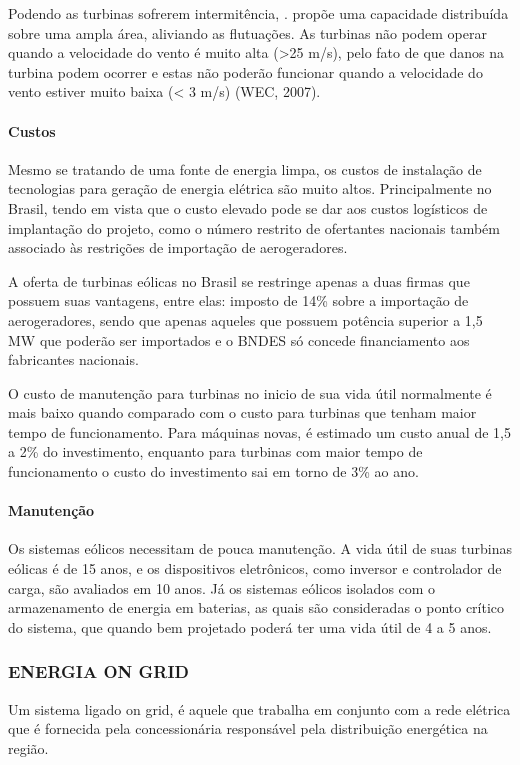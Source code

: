   Podendo as turbinas sofrerem intermitência, \cite{edmondes2007}. propõe uma capacidade distribuída sobre uma ampla área, aliviando as flutuações. As turbinas não podem operar quando a velocidade do vento é muito alta (>25 m/s), pelo fato de que danos na turbina podem ocorrer e estas não poderão funcionar quando a velocidade do vento estiver muito baixa (< 3 m/s) (WEC, 2007).
  
  \paragraph{Custos}
  Mesmo se tratando de uma fonte de energia limpa, os custos de instalação de tecnologias para geração de energia elétrica são muito altos. Principalmente no Brasil, tendo em vista que o custo elevado pode se dar aos custos logísticos de implantação do projeto, como o número restrito de ofertantes nacionais também associado às restrições de importação de aerogeradores.
  
  A oferta de turbinas eólicas no Brasil se restringe apenas a duas firmas que possuem suas vantagens, entre elas: imposto de 14\% sobre a importação de aerogeradores, sendo que apenas aqueles que possuem potência superior a 1,5 MW que poderão ser importados e o BNDES só concede financiamento aos fabricantes nacionais.

  O custo de manutenção para turbinas no inicio de sua vida útil normalmente é mais baixo quando comparado com o custo para turbinas que tenham maior tempo de funcionamento. Para máquinas novas, é estimado um custo anual de 1,5 a 2\% do investimento, enquanto para turbinas com maior tempo de funcionamento o custo do investimento sai em torno de 3\% ao ano.
  
  \paragraph{Manutenção}
  Os sistemas eólicos necessitam de pouca manutenção. A vida útil de suas turbinas eólicas é de 15 anos, e os dispositivos eletrônicos, como inversor e controlador de carga, são avaliados em 10 anos. Já os sistemas eólicos isolados com o armazenamento de energia em baterias, as quais são consideradas o ponto crítico do sistema, que quando bem projetado poderá ter uma vida útil de 4 a 5 anos.

  \subsubsection{ENERGIA ON GRID}
  Um sistema ligado on grid, é aquele que trabalha em conjunto com a rede elétrica que é fornecida pela concessionária responsável pela distribuição energética na região.

